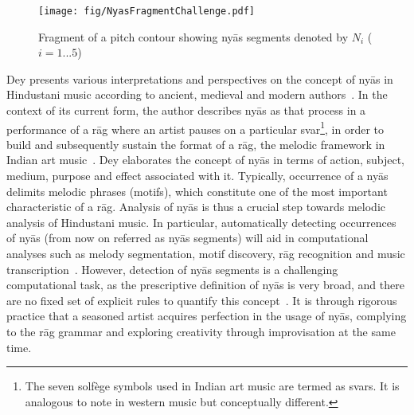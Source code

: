 {{%

\begin{figure}[htb]
	\begin{center}
		\texttt{[image: fig/NyasFragmentChallenge.pdf]}\vspace{-1.5em}
	\end{center}
	\caption{Fragment of a pitch contour showing ny\={a}s segments denoted by $N_i$ ($i={1...5}$)}
	\label{fig:NyasChallenge}
\end{figure}

Dey presents various interpretations and perspectives on the concept of ny\={a}s in Hindustani music according to ancient, medieval and modern authors~\cite{Dey2008}. In the context of its current form, the author describes ny\={a}s as that process in a performance of a r\={a}g where an artist pauses on a particular svar\footnote{The seven solf\`{e}ge symbols used in Indian art music are termed as svars. It is analogous to note in western music but conceptually different.}, in order to build and subsequently sustain the format of a r\={a}g, the melodic framework in Indian art music~\cite[p. 70]{Dey2008}\cite{KKG_SS13}. Dey elaborates the concept of ny\={a}s in terms of action, subject, medium, purpose and effect associated with it. Typically, occurrence of a ny\={a}s delimits melodic phrases (motifs), which constitute one of the most important characteristic of a r\={a}g. Analysis of ny\={a}s is thus a crucial step towards melodic analysis of Hindustani music. In particular, automatically detecting occurrences of ny\={a}s (from now on referred as ny\={a}s segments) will aid in computational analyses such as melody segmentation, motif discovery, r\={a}g recognition and music transcription~\cite{GopalJNMR2012, Rao2014}. However, detection of ny\={a}s segments is a challenging computational task, as the prescriptive definition of ny\={a}s is very broad, and there are no fixed set of explicit rules to quantify this concept~\cite[p. 73]{Dey2008}. It is through rigorous practice that a seasoned artist acquires perfection in the usage of ny\={a}s, complying to the r\={a}g grammar and exploring creativity through improvisation at the same time. 

}}
